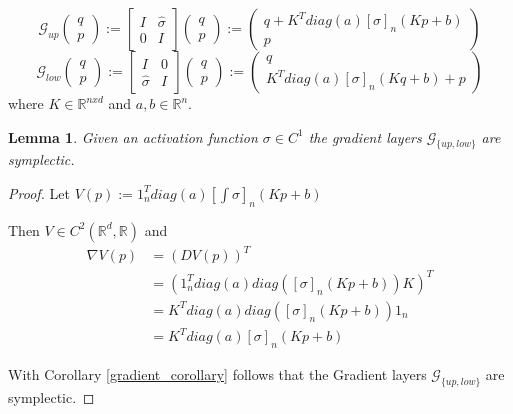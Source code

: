\documentclass[twoside,a4paper]{article}
\begin{document}
\begin{equation*}
	\mathcal{G}_{up} \begin{pmatrix}
		q \\
		p
	\end{pmatrix} := \begin{bmatrix}
		I & \hat{\sigma} \\
		0 & I
	\end{bmatrix} \begin{pmatrix}
		q \\
		p
	\end{pmatrix} := \begin{pmatrix}
		q + K^T diag(a) [\sigma]_n(Kp + b) \\
		p
	\end{pmatrix}
\end{equation*}
\begin{equation*}
	\mathcal{G}_{low} \begin{pmatrix}
		q \\
		p
	\end{pmatrix} := \begin{bmatrix}
		I & 0 \\
		\hat{\sigma} & I
	\end{bmatrix} \begin{pmatrix}
		q \\
		p
	\end{pmatrix} := \begin{pmatrix}
		q \\
		K^T diag(a) [\sigma]_n(Kq + b) + p
	\end{pmatrix}
\end{equation*}
where $K \in \mathbb{R}^{nxd}$ and $a,b \in \mathbb{R}^n$.

\newtheorem*{glayer}{Lemma}
\begin{glayer}
	Given an activation function $\sigma \in C^1$ the gradient layers $\mathcal{G}_{\{up,low\}}$ 
	are symplectic.
\end{glayer}
\begin{proof}
	Let $V(p) := 1_n^Tdiag(a)[\int \sigma]_n(Kp+b)$ 

	Then $V \in C^2(\mathbb{R}^d, \mathbb{R})$ and
	\begin{align*}
		\nabla V(p) &= \left(DV(p)\right)^T \\
		&= \left(1_n^Tdiag(a)diag\left([\sigma]_n(Kp+b)\right)K\right)^T \\
		&= K^Tdiag(a)diag\left([\sigma]_n(Kp+b)\right)1_n \\
		&= K^Tdiag(a)[\sigma]_n(Kp+b)
	\end{align*}

	With Corollary \ref{gradient_corollary} follows that the Gradient layers $\mathcal{G}_{\{up,low\}}$
	are symplectic. 
\end{proof}
\end{document}
